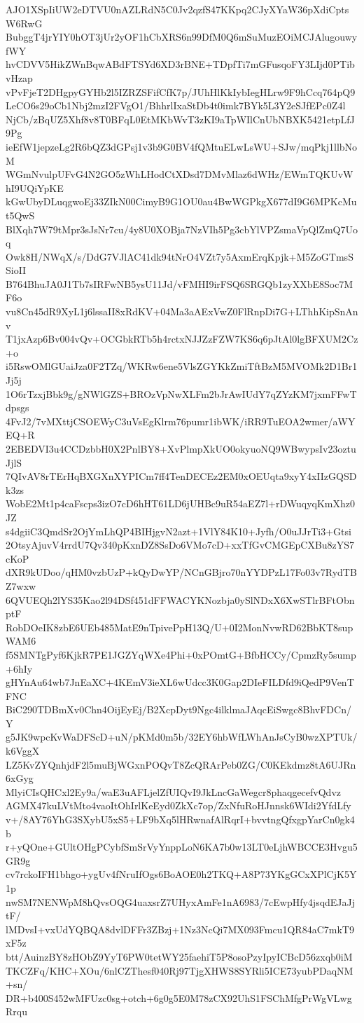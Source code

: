 AJO1XSpIiUW2eDTVU0nAZLRdN5C0Jv2qzfS47KKpq2CJyXYaW36pXdiCptsW6RwG
BubggT4jrYIY0hOT3jUr2yOF1hCbXRS6n99DfM0Q6mSuMuzEOiMCJAlugouwyfWY
hvCDVV5HikZWnBqwABdFTSYd6XD3rBNE+TDpfTi7mGFusqoFY3LIjd0PTibvHzap
vPvFjeT2DHgpyGYHb2l5IZRZSFifCfK7p/JUhHlKkIybIegHLrw9F9hCcq764pQ9
LeCO6s29oCb1Nbj2mzI2FVgO1/BhhrlIxaStDb4t0imk7BYk5L3Y2eSJfEPc0Z4l
NjCb/zBqUZ5Xhf8v8T0BFqL0EtMKbWvT3zKI9aTpWIlCnUbNBXK5421etpLfJ9Pg
ieEfW1jepzeLg2R6bQZ3dGPsj1v3b9G0BV4fQMtuELwLsWU+SJw/mqPkj1llbNoM
WGmNvulpUFvG4N2GO5zWhLHodCtXDsd7DMvMlaz6dWHz/EWmTQKUvWhI9UQiYpKE
kGwUbyDLuqgwoEj33ZIkN00CimyB9G1OU0au4BwWGPkgX677dI9G6MPKcMut5QwS
BlXqh7W79tMpr3sJsNr7cu/4y8U0XOBja7NzVIh5Pg3cbYlVPZsmaVpQlZmQ7Uoq
Owk8H/NWqX/s/DdG7VJlAC41dk94tNrO4VZt7y5AxmErqKpjk+M5ZoGTmsSSioII
B764BhuJA0J1Tb7sIRFwNB5ysU11Jd/vFMHI9irFSQ6SRGQb1zyXXbE8Soc7MF6o
vu8Cn45dR9XyL1j6lssaII8xRdKV+04Ma3aAExVwZ0FlRnpDi7G+LThhKipSnAnv
T1jxAzp6Bv004vQv+OCGbkRTb5h4rctxNJJZzFZW7KS6q6pJtAl0lgBFXUM2Cz+o
i5RswOMlGUaiJza0F2TZq/WKRw6ene5VlsZGYKkZmiTftBzM5MVOMk2D1Br1Jj5j
1O6rTzxjBbk9g/gNWlGZS+BROzVpNwXLFm2bJrAwIUdY7qZYzKM7jxmFFwTdpsgs
4FvJ2/7vMXttjCSOEWyC3uVsEgKlrm76pumr1ibWK/iRR9TuEOA2wmer/aWYEQ+R
2EBEDVI3u4CCDzbbH0X2PnlBY8+XvPlmpXkUO0okyuoNQ9WBwypsIv23oztuJjlS
7QIvAV8rTErHqBXGXnXYPICm7ff4TenDECEz2EM0xOEUqta9xyY4xIIzGQSDk3zs
WobE2Mt1p4caFscps3izO7cD6hHT61LD6jUHBc9uR54aEZ7l+rDWuqyqKmXhz0JZ
s4dgiiC3QmdSr2OjYmLhQP4BIHjgvN2azt+1VlY84K10+Jyfh/O0uJJrTi3+Gtsi
2OtsyAjuvV4rrdU7Qv340pKxnDZ8SsDo6VMo7cD+xxTfGvCMGEpCXBu8zYS7cKoP
dXR9kUDoo/qHM0vzbUzP+kQyDwYP/NCnGBjro70nYYDPzL17Fo03v7RydTBZ7wxw
6QVUEQh2lYS35Kao2l94DSf451dFFWACYKNozbja0ySlNDxX6XwSTlrBFtObnptF
RobDOeIK8zbE6UEb485MatE9nTpivePpH13Q/U+0I2MonNvwRD62BbKT8supWAM6
f5SMNTgPyf6KjkR7PE1JGZYqWXe4Phi+0xPOmtG+BfbHCCy/CpmzRy5sump+6hIy
gHYnAu64wb7JnEaXC+4KEmV3ieXL6wUdcc3K0Gap2DIeFILDfd9iQedP9VenTFNC
BiC290TDBmXv0Chn4OijEyEj/B2XcpDyt9Ngc4ilklmaJAqcEiSwgc8BhvFDCn/Y
g5JK9wpcKvWaDFScD+uN/pKMd0m5b/32EY6hbWfLWhAnJsCyB0wzXPTUk/k6VggX
LZ5KvZYQnhjdF2l5muBjWGxnPOQvT8ZcQRArPeb0ZG/C0KEkdmz8tA6UJRn6xGyg
MlyiCIsQHCxl2Ey9a/waE3uAFLjelZfUIQvI9JkLncGaWegcr8phaqgecefvQdvz
AGMX47kuLVtMto4vaoItOhIrlKeEyd0ZkXc7op/ZxNfuRoHJnnsk6WIdi2YfdLfy
v+/8AY76YhG3SXybU5xS5+LF9bXq5lHRwnafAlRqrI+bvvtngQfxgpYarCn0gk4b
r+yQOne+GUltOHgPCybfSmSrVyYnppLoN6KA7b0w13LT0eLjhWBCCE3Hvgu5GR9g
cv7rckoIFH1bhgo+ygUv4fNruIfOgs6BoAOE0h2TKQ+A8P73YKgGCxXPlCjK5Y1p
nwSM7NENWpM8hQvsOQG4uaxsrZ7UHyxAmFe1nA6983/7cEwpHfy4jsqdEJaJjtF/
lMDvsI+vxUdYQBQA8dvlDFFr3ZBzj+1Nz3NcQi7MX093Fmcu1QR84aC7mkT9xF5z
btt/AuinzBY8zHObZ9YyT6PW0tetWY25faehiT5P8osoPzyIpyICBcD56zxqb0iM
TKCZFq/KHC+XOu/6nlCZThesf040Rj97TjgXHWS8SYRli5ICE73yubPDaqNM+sn/
DR+b400S452wMFUzc0sg+otch+6g0g5E0M78zCX92UhS1FSChMfgPrWgVLwgRrqu

